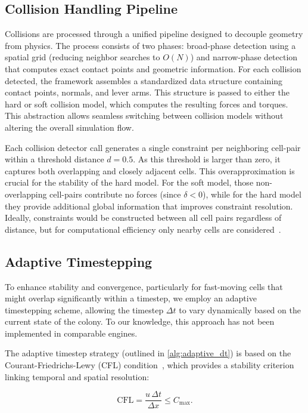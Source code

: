 \documentclass[conference]{IEEEtran}
\begin{document}
\subsection{Collision Handling Pipeline}

Collisions are processed through a unified pipeline designed to decouple geometry from physics. The process consists of two phases: broad-phase detection using a spatial grid (reducing neighbor searches to $O(N)$) and narrow-phase detection that computes exact contact points and geometric information. For each collision detected, the framework assembles a standardized data structure containing contact points, normals, and lever arms. This structure is passed to either the hard or soft collision model, which computes the resulting forces and torques. This abstraction allows seamless switching between collision models without altering the overall simulation flow.

Each collision detector call generates a single constraint per neighboring cell-pair within a threshold distance $d = 0.5$. As this threshold is larger than zero, it captures both overlapping and closely adjacent cells. This overapproximation is crucial for the stability of the hard model. For the soft model, those non-overlapping cell-pairs contribute no forces (since $\delta < 0$), while for the hard model they provide additional global information that improves constraint resolution. Ideally, constraints would be constructed between all cell pairs regardless of distance, but for computational efficiency only nearby cells are considered~\cite{Yan2019, Yan2022}.

\subsection{Adaptive Timestepping}

To enhance stability and convergence, particularly for fast-moving cells that might overlap significantly within a timestep, we employ an adaptive timestepping scheme, allowing the timestep $\Delta t$ to vary dynamically based on the current state of the colony. To our knowledge, this approach has not been implemented in comparable engines.

The adaptive timestep strategy (outlined in \autoref{alg:adaptive_dt}) is based on the Courant-Friedrichs-Lewy (CFL) condition~\cite{Courant1928}, which provides a stability criterion linking temporal and spatial resolution:

\begin{equation}
    \text{CFL} = \frac{u \, \Delta t}{\Delta x} \leq C_{\text{max}}.
\end{equation}
\end{document}
